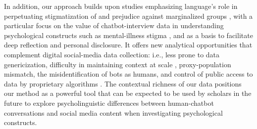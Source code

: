 
In addition, our approach builds upon studies emphasizing language's role in perpetuating stigmatization of and prejudice against marginalized groups \cite{social_media_bail_2017, social_media_pavlova_2020, detect_method_fang_2023, detect_method_mittal_2023, detect_method_roesler_2024}, with a particular focus on the value of chatbot-interview data in understanding psychological constructs such as mental-illness stigma \cite{conversation_importance_jenlink_2005, interview_stigma_measure_lyons_1995}, and as a basis to facilitate deep reflection and personal disclosure. 
It offers new analytical opportunities that complement digital social-media data collection: i.e., less prone to data genericization, difficulty in maintaining context at scale \cite{social_media_decontext_boyd_2012}, proxy-population mismatch, the misidentification of bots as humans, and control of public access to data by proprietary algorithms \cite{social_media_deidentify_ruths_2014}. 
The contextual richness of our data positions our method as a powerful tool that can be expected to be used by scholars in the future to explore psycholinguistic differences between human-chatbot conversations and social media content when investigating psychological constructs.




